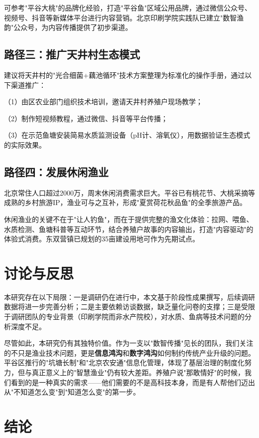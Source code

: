 \documentclass[12pt,a4paper]{article}
\begin{document}
可参考"平谷大桃"的品牌化经验，打造"平谷鱼"区域公用品牌，通过微信公众号、视频号、抖音等新媒体平台进行内容营销。北京印刷学院实践队已建立"数智渔韵"公众号，为内容传播提供了初步渠道。

\subsection{路径三：推广天井村生态模式}

建议将天井村的"光合细菌+藕池循环"技术方案整理为标准化的操作手册，通过以下渠道推广：

（1）由区农业部门组织技术培训，邀请天井村养殖户现场教学；

（2）制作短视频教程，通过微信、抖音等平台传播；

（3）在示范鱼塘安装简易水质监测设备（pH计、溶氧仪），用数据验证生态模式的实际效果。

\subsection{路径四：发展休闲渔业}

北京常住人口超过2000万，周末休闲消费需求巨大。平谷已有桃花节、大桃采摘等成熟的乡村旅游IP，渔业可与之互补，形成"夏赏荷花秋品鱼"的全季旅游产品。

休闲渔业的关键不在于"让人钓鱼"，而在于提供完整的渔文化体验：拉网、喂鱼、水质检测、鱼塘科普等互动环节，结合养殖户故事的内容输出，打造"内容驱动"的体验式消费。东双营镇已规划的35亩建设用地可作为先期试点。

\section{讨论与反思}

本研究存在以下局限：一是调研仍在进行中，本文基于阶段性成果撰写，后续调研数据将进一步完善分析；二是主要依赖访谈数据，缺乏量化问卷的支撑；三是受限于调研团队的专业背景（印刷学院而非水产院校），对水质、鱼病等技术问题的分析深度不足。

尽管如此，本研究仍有其独特价值。作为一支以"数智传播"见长的团队，我们关注的不只是渔业技术问题，更是\textbf{信息鸿沟}和\textbf{数字鸿沟}如何制约传统产业升级的问题。平谷区推行的"坑塘长制"和"北京农安通"信息化管理，体现了基层治理的制度化努力，但与真正意义上的"智慧渔业"仍有较大差距。养殖户说"那敢情好"的时候，我们看到的是一种真实的需求——他们需要的不是高科技本身，而是有人帮他们迈出从"不知道怎么变"到"知道怎么变"的第一步。

\section{结论}
\end{document}

